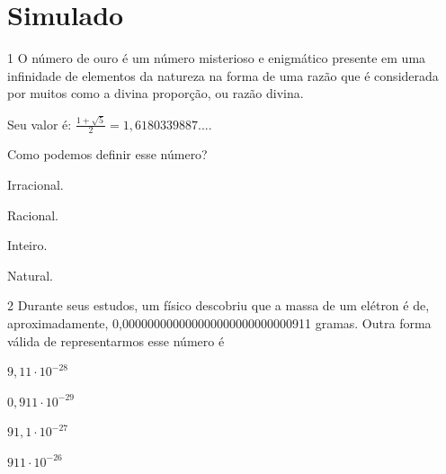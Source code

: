 
\setcounter{chapter}{0}
\chapter[Simulado 1]{Simulado}

\num{1} O número de ouro é um número misterioso e enigmático presente em uma
infinidade de elementos da natureza na forma de uma razão que é
considerada por muitos como a divina proporção, ou razão divina.

Seu valor é: $\frac{1 + \sqrt{5}}{2} = 1,6180339887...$.

Como podemos definir esse número?

\begin{escolha}
\item Irracional.
\item Racional.
\item Inteiro.
\item Natural.
\end{escolha}






\num{2} Durante seus estudos, um físico descobriu que a massa de um elétron
é de, aproximadamente, 0,000000000000000000000000000911 gramas. Outra forma
válida de representarmos esse número é

\begin{escolha}
\item $9,11 \cdot 10^{-28}$
\item $0,911 \cdot 10^{-29}$
\item $91,1 \cdot 10^{-27}$
\item $911 \cdot 10^{-26}$
\end{escolha}


